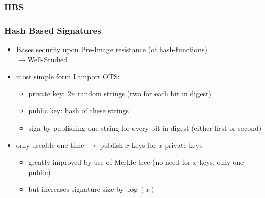 \documentclass[ucs,10pt]{beamer}
\begin{document}
\subsubsection{HBS}
\begin{frame}
  \frametitle{Hash Based Signatures}

  \begin{itemize}
    \item Bases security upon Pre-Image resistance (of hash-functions) \\$\rightarrow$Well-Studied
    \item most simple form Lamport OTS: \begin{itemize}
      \item private key: $2n$ random strings (two for each bit in digest)
      \item public key: hash of these strings
      \item sign by publishing one string for every bit in digest (either first or second)
    \end{itemize}
    \item only useable one-time $\rightarrow$ publish $x$ keys for $x$ private keys
    \begin{itemize}
      \item greatly improved by use of Merkle tree (no need for $x$ keys, only one public)
      \item but increases signature size by $\log(x)$
    \end{itemize}
    
  \end{itemize}

\end{frame}
\end{document}
